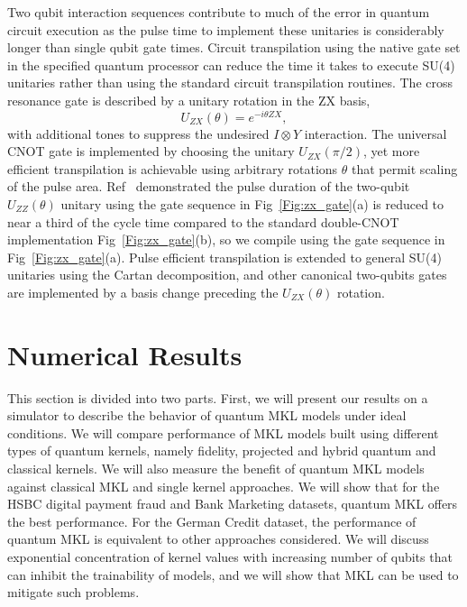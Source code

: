 \documentclass[reprint,amsfonts, amssymb, amsmath,  showkeys, nofootinbib,pra, superscriptaddress, twocolumn,longbibliography]{revtex4-2}
\begin{document}
Two qubit interaction sequences contribute to much of the error in quantum circuit execution as the pulse time to implement these unitaries is considerably longer than single qubit gate times. Circuit transpilation using the native gate set in the specified quantum processor can reduce the time it takes to execute SU(4) unitaries rather than using the standard circuit transpilation routines. The cross resonance gate is described by a unitary rotation in the ZX basis,
\begin{equation}
U_{ZX}(\theta) = e^{-i\theta ZX},
\end{equation}
with additional tones to suppress the undesired $I\otimes Y$ interaction. The universal CNOT gate is implemented by choosing the unitary $U_{ZX}(\pi/2)$, yet  more efficient transpilation is achievable using arbitrary rotations $\theta$ that permit scaling of the pulse area. Ref~\cite{Earnest2021pulse} demonstrated the pulse duration of the two-qubit $U_{ZZ}(\theta)$ unitary using the gate sequence in Fig~\ref{Fig:zx_gate}(a) is reduced to near a third of the cycle time compared to the standard double-CNOT implementation Fig~\ref{Fig:zx_gate}(b), so we compile using the gate sequence in Fig~\ref{Fig:zx_gate}(a).  Pulse efficient transpilation is extended to general SU(4) unitaries using the Cartan decomposition, and other canonical two-qubits gates are implemented by a basis change preceding the $U_{ZX}(\theta)$ rotation. 

\section{Numerical Results}

This section is divided into two parts. First, we will present our results on a simulator to describe the behavior of quantum MKL models under ideal conditions. We will compare performance of MKL models built using different types of quantum kernels, namely fidelity, projected and hybrid quantum and classical kernels. We will also measure the benefit of quantum MKL models against classical MKL and single kernel approaches. We will show that for the HSBC digital payment fraud and Bank Marketing datasets, quantum MKL offers the best performance. For the German Credit dataset, the performance of quantum MKL is equivalent to other approaches considered. We will discuss exponential concentration of kernel values with increasing number of qubits that can inhibit the trainability of models, and we will show that MKL can be used to mitigate such problems.
\end{document}
